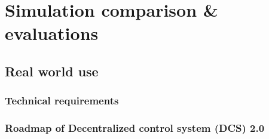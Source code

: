 \chapter{Simulation comparison \& evaluations}


\section{Real world use}
\subsection{Technical requirements}
\subsection{Roadmap of Decentralized control system (DCS) 2.0 }